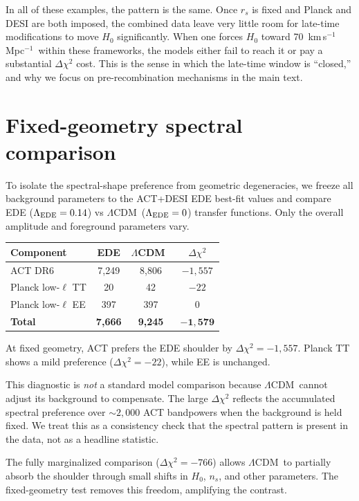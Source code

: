 \documentclass[onecolumn,showpacs,preprintnumbers,amsmath,amssymb,prd]{revtex4-2}
\newcommand{\lcdm}{$\Lambda$CDM}
\newcommand{\kms}{km\,s$^{-1}$\,Mpc$^{-1}$}
\begin{document}
In all of these examples, the pattern is the same. Once $r_s$ is fixed and Planck 
and DESI are both imposed, the combined data leave very little room for late-time 
modifications to move $H_0$ significantly. When one forces $H_0$ toward 
70~\kms\ within these frameworks, the models either fail to 
reach it or pay a substantial $\Delta\chi^2$ cost. This is the sense in which the 
late-time window is ``closed,'' and why we focus on pre-recombination mechanisms in 
the main text.

\section{Fixed-geometry spectral comparison}
\label{app:fixedgeom}

To isolate the spectral-shape preference from geometric degeneracies, we freeze 
all background parameters to the ACT+DESI EDE best-fit values and compare 
EDE ($\Lambda_{\rm EDE} = 0.14$) vs \lcdm\ ($\Lambda_{\rm EDE} = 0$) transfer 
functions. Only the overall amplitude and foreground parameters vary.

\begin{center}
\begin{tabular}{lccc}
\toprule
Component & EDE & \lcdm\ & $\Delta\chi^2$ \\
\midrule
ACT DR6 & 7{,}249 & 8{,}806 & $-1{,}557$ \\
Planck low-$\ell$ TT & 20 & 42 & $-22$ \\
Planck low-$\ell$ EE & 397 & 397 & $0$ \\
\midrule
\textbf{Total} & \textbf{7{,}666} & \textbf{9{,}245} & $\mathbf{-1{,}579}$ \\
\bottomrule
\end{tabular}
\end{center}

At fixed geometry, ACT prefers the EDE shoulder by $\Delta\chi^2 = -1{,}557$. 
Planck TT shows a mild preference ($\Delta\chi^2 = -22$), while EE is unchanged.

This diagnostic is \emph{not} a standard model comparison because \lcdm\ cannot 
adjust its background to compensate. The large $\Delta\chi^2$ reflects the 
accumulated spectral preference over $\sim 2{,}000$ ACT bandpowers when the 
background is held fixed. We treat this as a consistency check that the 
spectral pattern is present in the data, not as a headline statistic.

The fully marginalized comparison ($\Delta\chi^2 = -766$) allows \lcdm\ to 
partially absorb the shoulder through small shifts in $H_0$, $n_s$, and other 
parameters. The fixed-geometry test removes this freedom, amplifying the contrast.
\end{document}
